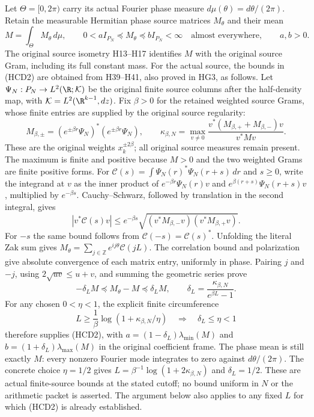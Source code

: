 Let $\Theta=[0,2\pi)$ carry its actual Fourier phase measure
$d\mu(\theta)=d\theta/(2\pi)$. Retain the measurable Hermitian
phase source matrices $M_\theta$ and their mean
\[
 M=\int_\Theta M_\theta\,d\mu,\qquad
 0<a I_{P_N}\preceq M_\theta\preceq b I_{P_N}<\infty
 \quad\text{almost everywhere},\qquad a,b>0.
 \tag{HCD2}
\]
The original source isometry H13--H17 identifies $M$ with the
original source Gram, including its full constant mass.
For the actual source, the bounds in (HCD2) are obtained from
H39--H41, also proved in HG3, as follows. Let
$\Psi_N:P_N\to L^2(\R;\mathcal K)$ be the original finite
source columns after the half-density map, with
$\mathcal K=L^2(\R^{k-1},dz)$. Fix $\beta>0$ for the retained
weighted source Grams, whose finite entries are supplied by
the original source regularity:
\[
 M_{\beta,\pm}=(e^{\pm\beta r}\Psi_N)^*
                    (e^{\pm\beta r}\Psi_N),\qquad
 \kappa_{\beta,N}=
 \max_{v\ne0}\frac{v^*(M_{\beta,+}+M_{\beta,-})v}{v^*Mv}.
 \tag{HCD2a}
\]
These are the original weights $x_k^{\pm2\beta}$; all original
source measures remain present. The maximum is finite and positive
because $M>0$ and the two weighted Grams are finite positive forms.
For $\mathcal C(s)=\int\Psi_N(r)^*\Psi_N(r+s)\,dr$ and $s\ge0$,
write the integrand at $v$ as the inner product of
$e^{-\beta r}\Psi_N(r)v$ and
$e^{\beta(r+s)}\Psi_N(r+s)v$, multiplied by $e^{-\beta s}$.
Cauchy--Schwarz, followed by translation in the second integral,
gives
\[
 |v^*\mathcal C(s)v|
 \le e^{-\beta s}
 \sqrt{(v^*M_{\beta,-}v)(v^*M_{\beta,+}v)} .
\]
For $-s$ the same bound follows from
$\mathcal C(-s)=\mathcal C(s)^*$.
Unfolding the literal Zak sum gives
$M_\theta=\sum_{j\in\mathbb Z}e^{ij\theta}\mathcal C(jL)$.
The correlation bound and polarization give absolute convergence
of each matrix entry, uniformly in phase. Pairing $j$ and $-j$,
using $2\sqrt{uv}\le u+v$, and summing the geometric series prove
\[
 -\delta_LM\preceq M_\theta-M\preceq\delta_LM,\qquad
 \delta_L=\frac{\kappa_{\beta,N}}{e^{\beta L}-1}.
 \tag{HCD2b}
\]
For any chosen $0<\eta<1$, the explicit finite circumference
\[
 L\ge\frac1\beta\log(1+\kappa_{\beta,N}/\eta)
 \quad\Longrightarrow\quad
 \delta_L\le\eta<1
 \tag{HCD2c}
\]
therefore supplies (HCD2), with
$a=(1-\delta_L)\lambda_{\min}(M)$ and
$b=(1+\delta_L)\lambda_{\max}(M)$ in the original coefficient
frame. The phase mean is still exactly $M$: every nonzero
Fourier mode integrates to zero against $d\theta/(2\pi)$.
The concrete choice $\eta=1/2$ gives
$L=\beta^{-1}\log(1+2\kappa_{\beta,N})$ and $\delta_L=1/2$.
These are actual finite-source bounds at the stated cutoff;
no bound uniform in $N$ or the arithmetic packet is asserted.
The argument below also applies to any fixed $L$ for which
(HCD2) is already established.

